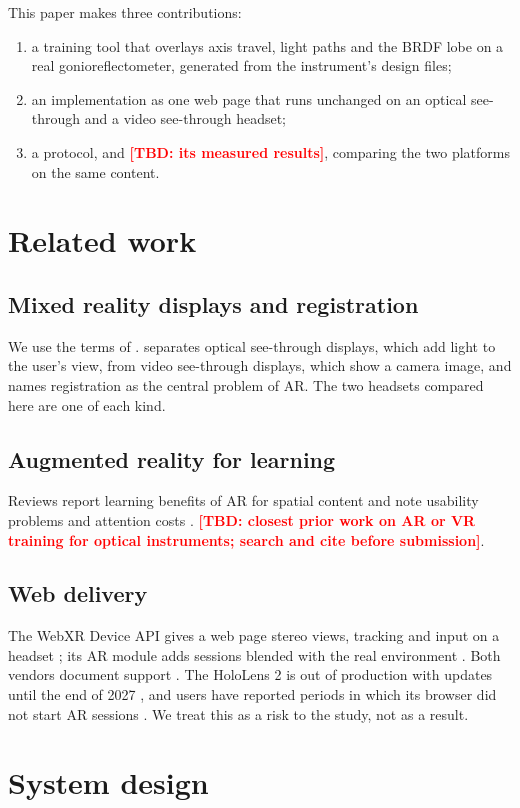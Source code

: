 \documentclass[11pt]{article}
\newcommand{\tbd}[1]{\textcolor{red}{\textbf{[TBD: #1]}}}
\begin{document}
This paper makes three contributions:
\begin{enumerate}
\item a training tool that overlays axis travel, light paths and the BRDF lobe on a real gonioreflectometer, generated
 from the instrument's design files;
\item an implementation as one web page that runs unchanged on an optical see-through and a video see-through headset;
\item a protocol, and \tbd{its measured results}, comparing the two platforms on the same content.
\end{enumerate}

\section{Related work}
\subsection{Mixed reality displays and registration}
We use the terms of \textcite{X7}. \textcite{X8} separates optical see-through displays, which add light to the user's
view, from video see-through displays, which show a camera image, and names registration as the central problem of
AR. The two headsets compared here are one of each kind.

\subsection{Augmented reality for learning}
Reviews report learning benefits of AR for spatial content and note usability problems and attention costs
\parencite{X12,X13}. \tbd{closest prior work on AR or VR training for optical instruments; search and cite before
submission}.

\subsection{Web delivery}
The WebXR Device API gives a web page stereo views, tracking and input on a headset \parencite{X1}; its AR module adds
sessions blended with the real environment \parencite{X2}. Both vendors document support
\parencite{X3,X4}. The HoloLens 2 is out of production with updates until the end of 2027 \parencite{X5}, and users
have reported periods in which its browser did not start AR sessions \parencite{X6}. We treat this as a risk to the
study, not as a result.

\section{System design}
\end{document}
